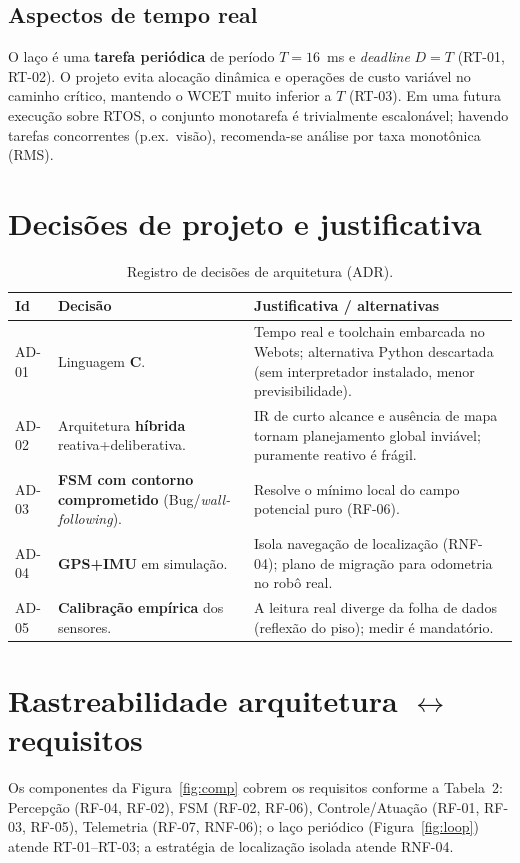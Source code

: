 \subsection{Aspectos de tempo real}
O laço é uma \textbf{tarefa periódica} de período $T=16$~ms e \emph{deadline} $D=T$ (RT-01, RT-02). O projeto evita alocação dinâmica e operações de custo variável no caminho crítico, mantendo o WCET muito inferior a $T$ (RT-03). Em uma futura execução sobre RTOS, o conjunto monotarefa é trivialmente escalonável; havendo tarefas concorrentes (p.ex.\ visão), recomenda-se análise por taxa monotônica (RMS).

\section{Decisões de projeto e justificativa}
\begin{table}[H]\centering
\caption{Registro de decisões de arquitetura (ADR).}
\renewcommand{\arraystretch}{1.25}
\begin{tabularx}{\textwidth}{@{}l X X@{}}
\toprule
\textbf{Id} & \textbf{Decisão} & \textbf{Justificativa / alternativas} \\
\midrule
AD-01 & Linguagem \textbf{C}. & Tempo real e toolchain embarcada no Webots; alternativa Python descartada (sem interpretador instalado, menor previsibilidade). \\
AD-02 & Arquitetura \textbf{híbrida} reativa+deliberativa. & IR de curto alcance e ausência de mapa tornam planejamento global inviável; puramente reativo é frágil. \\
AD-03 & \textbf{FSM com contorno comprometido} (Bug/\emph{wall-following}). & Resolve o mínimo local do campo potencial puro (RF-06). \\
AD-04 & \textbf{GPS+IMU} em simulação. & Isola navegação de localização (RNF-04); plano de migração para odometria no robô real. \\
AD-05 & \textbf{Calibração empírica} dos sensores. & A leitura real diverge da folha de dados (reflexão do piso); medir é mandatório. \\
\bottomrule
\end{tabularx}
\end{table}

\section{Rastreabilidade arquitetura $\leftrightarrow$ requisitos}
Os componentes da Figura~\ref{fig:comp} cobrem os requisitos conforme a Tabela~2: Percepção (RF-04, RF-02), FSM (RF-02, RF-06), Controle/Atuação (RF-01, RF-03, RF-05), Telemetria (RF-07, RNF-06); o laço periódico (Figura~\ref{fig:loop}) atende RT-01--RT-03; a estratégia de localização isolada atende RNF-04.


